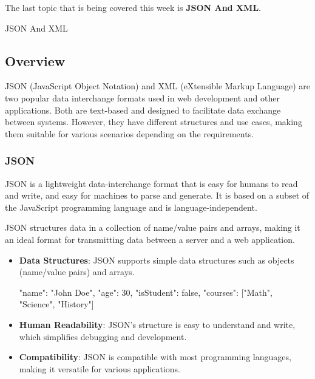 The last topic that is being covered this week is \textbf{JSON And XML}.

\begin{notes}{JSON And XML}
    \subsection*{Overview}

    JSON (JavaScript Object Notation) and XML (eXtensible Markup Language) are two popular data interchange formats used in web development and other applications. Both are text-based and designed to 
    facilitate data exchange between systems. However, they have different structures and use cases, making them suitable for various scenarios depending on the requirements.
    
    \subsubsection*{JSON}
    
    JSON is a lightweight data-interchange format that is easy for humans to read and write, and easy for machines to parse and generate. It is based on a subset of the JavaScript programming language 
    and is language-independent.
    
    \begin{highlight}[JSON]
    
        JSON structures data in a collection of name/value pairs and arrays, making it an ideal format for transmitting data between a server and a web application.
        
        \begin{itemize}
            \item \textbf{Data Structures}: JSON supports simple data structures such as objects (name/value pairs) and arrays.
    \begin{code}[JSON]
    {
        "name": "John Doe",
        "age": 30,
        "isStudent": false,
        "courses": ["Math", "Science", "History"]
    }
    \end{code}
            \item \textbf{Human Readability}: JSON's structure is easy to understand and write, which simplifies debugging and development.
            \item \textbf{Compatibility}: JSON is compatible with most programming languages, making it versatile for various applications.
        \end{itemize}
    

\end{highlight}
\end{notes}
